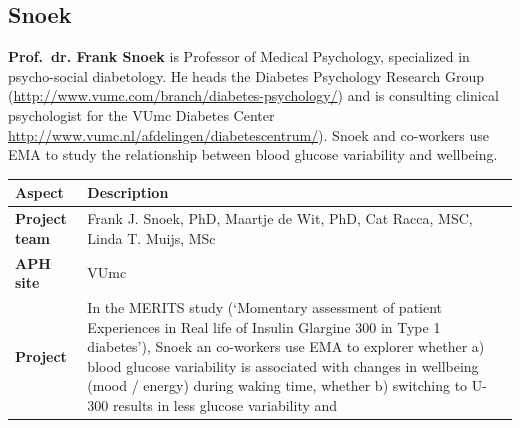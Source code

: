 \documentclass[]{book}
\begin{document}
\subsection{Snoek}\label{snoek}

 

\textbf{Prof.~dr. Frank Snoek} is Professor of Medical Psychology,
specialized in psycho-social diabetology. He heads the Diabetes
Psychology Research Group
(\url{http://www.vumc.com/branch/diabetes-psychology/}) and is
consulting clinical psychologist for the VUmc Diabetes Center
\url{http://www.vumc.nl/afdelingen/diabetescentrum/}). Snoek and
co-workers use EMA to study the relationship between blood glucose
variability and wellbeing.

\begin{longtable}[]{@{}ll@{}}
\toprule
\begin{minipage}[b]{0.25\columnwidth}\raggedright\strut
\textbf{Aspect}\strut
\end{minipage} & \begin{minipage}[b]{0.69\columnwidth}\raggedright\strut
\textbf{Description}\strut
\end{minipage}\tabularnewline
\midrule
\endhead
\begin{minipage}[t]{0.25\columnwidth}\raggedright\strut
\textbf{Project team}\strut
\end{minipage} & \begin{minipage}[t]{0.69\columnwidth}\raggedright\strut
Frank J. Snoek, PhD, Maartje de Wit, PhD, Cat Racca, MSC, Linda T.
Muijs, MSc\strut
\end{minipage}\tabularnewline
\begin{minipage}[t]{0.25\columnwidth}\raggedright\strut
\textbf{APH site}\strut
\end{minipage} & \begin{minipage}[t]{0.69\columnwidth}\raggedright\strut
VUmc\strut
\end{minipage}\tabularnewline
\begin{minipage}[t]{0.25\columnwidth}\raggedright\strut
\textbf{Project}\strut
\end{minipage} & \begin{minipage}[t]{0.69\columnwidth}\raggedright\strut
In the MERITS study (`Momentary assessment of patient Experiences in
Real life of Insulin Glargine 300 in Type 1 diabetes'), Snoek an
co-workers use EMA to explorer whether a) blood glucose variability is
associated with changes in wellbeing (mood / energy) during waking time,
whether b) switching to U-300 results in less glucose variability and

\end{minipage}
\end{longtable}
\end{document}
